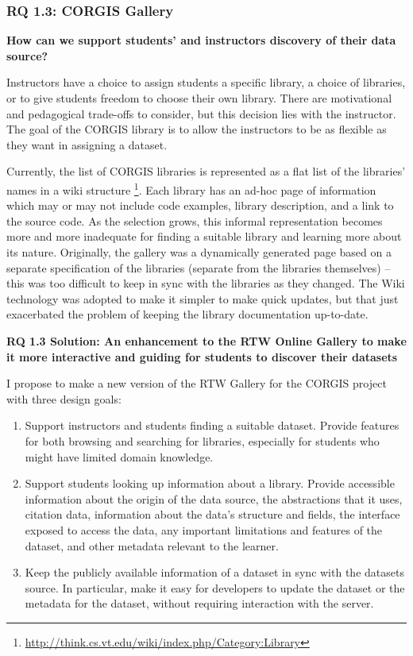     \subsubsection{RQ 1.3: CORGIS Gallery}
    
    \textbf{How can we support students' and instructors discovery of their data source?}
    
	Instructors have a choice to assign students a specific library, a choice of libraries, or to give students freedom to choose their own library.
    There are motivational and pedagogical trade-offs to consider, but this decision lies with the instructor.
    The goal of the CORGIS library is to allow the instructors to be as flexible as they want in assigning a dataset.
    
    Currently, the list of CORGIS libraries is represented as a flat list of the libraries' names in a wiki structure \footnote{\url{http://think.cs.vt.edu/wiki/index.php/Category:Library}}. Each library has an ad-hoc page of information which may or may not include code examples, library description, and a link to the source code. As the selection grows, this informal representation becomes more and more inadequate for finding a suitable library and learning more about its nature. Originally, the gallery was a dynamically generated page based on a separate specification of the libraries (separate from the libraries themselves) -- this was too difficult to keep in sync with the libraries as they changed. The Wiki technology was adopted to make it simpler to make quick updates, but that just exacerbated the problem of keeping the library documentation up-to-date.
    
    \textbf{RQ 1.3 Solution: An enhancement to the RTW Online Gallery to make it more interactive and guiding for students to discover their datasets}
    
    I propose to make a new version of the RTW Gallery for the CORGIS project with three design goals:
    \begin{enumerate}
    \item Support instructors and students finding a suitable dataset. Provide features for both browsing and searching for libraries, especially for students who might have limited domain knowledge.
    \item Support students looking up information about a library. Provide accessible information about the origin of the data source, the abstractions that it uses, citation data, information about the data's structure and fields, the interface exposed to access the data, any important limitations and features of the dataset, and other metadata relevant to the learner.
    \item Keep the publicly available information of a dataset in sync with the datasets source. In particular, make it easy for developers to update the dataset or the metadata for the dataset, without requiring interaction with the server.
    \end{enumerate}
    
